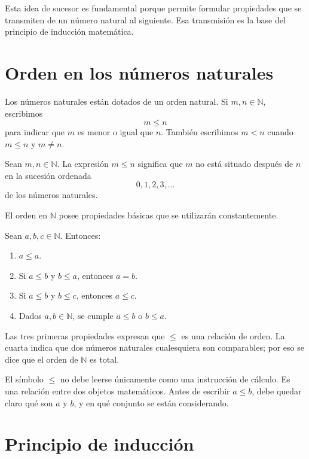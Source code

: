 Esta idea de sucesor es fundamental porque permite formular propiedades que se transmiten de un número natural al siguiente. Esa transmisión es la base del principio de inducción matemática.

\section{Orden en los números naturales}

Los números naturales están dotados de un orden natural. Si \(m,n\in\mathbb{N}\), escribimos
\[
  m\leq n
\]
para indicar que \(m\) es menor o igual que \(n\). También escribimos \(m<n\) cuando \(m\leq n\) y \(m\neq n\).

\begin{definicion}
Sean \(m,n\in\mathbb{N}\). La expresión \(m\leq n\) significa que \(m\) no está situado después de \(n\) en la sucesión ordenada
\[
  0,1,2,3,\ldots
\]
de los números naturales.
\end{definicion}

El orden en \(\mathbb{N}\) posee propiedades básicas que se utilizarán constantemente.

\begin{proposicion}
Sean \(a,b,c\in\mathbb{N}\). Entonces:
\begin{enumerate}
  \item \(a\leq a\).
  \item Si \(a\leq b\) y \(b\leq a\), entonces \(a=b\).
  \item Si \(a\leq b\) y \(b\leq c\), entonces \(a\leq c\).
  \item Dados \(a,b\in\mathbb{N}\), se cumple \(a\leq b\) o \(b\leq a\).
\end{enumerate}
\end{proposicion}

Las tres primeras propiedades expresan que \(\leq\) es una relación de orden. La cuarta indica que dos números naturales cualesquiera son comparables; por eso se dice que el orden de \(\mathbb{N}\) es total.

\begin{advertencia}
El símbolo \(\leq\) no debe leerse únicamente como una instrucción de cálculo. Es una relación entre dos objetos matemáticos. Antes de escribir \(a\leq b\), debe quedar claro qué son \(a\) y \(b\), y en qué conjunto se están considerando.
\end{advertencia}

\section{Principio de inducción}

